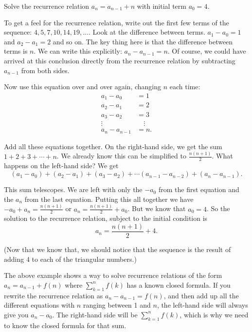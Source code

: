 \documentclass[11pt,]{book}
\theoremstyle{ptxplainnotitle}
\theoremstyle{ptxplaintitle}
\theoremstyle{ptxdefinitionnotitle}
\theoremstyle{ptxdefinitiontitle}
\theoremstyle{ptxdefinitionnotitle}
\theoremstyle{ptxdefinitiontitle}
\theoremstyle{ptxdefinitionnotitle}
\theoremstyle{ptxdefinitiontitle}
\theoremstyle{ptxdefinitiontitlenonumber}
\theoremstyle{ptxdefinitiontitlenonumber}
\numberwithin{equation}{chapter}
\newcommand{\amp}{&}
\begin{document}
\begin{example}\label{example-20}
\hypertarget{p-432}{}%
Solve the recurrence relation \(a_n = a_{n-1} + n\) with initial term \(a_0 = 4\).%
\par\smallskip%
\noindent\textbf{}\hypertarget{solution-66}{}\hypertarget{p-433}{}%
To get a feel for the recurrence relation, write out the first few terms of the sequence: \(4, 5, 7, 10, 14, 19, \ldots\). Look at the difference between terms. \(a_1 - a_0 = 1\) and \(a_2 - a_1 = 2\) and so on. The key thing here is that the difference between terms is \(n\). We can write this explicitly: \(a_n - a_{n-1} = n\). Of course, we could have arrived at this conclusion directly from the recurrence relation by subtracting \(a_{n-1}\) from both sides.%
\par
\hypertarget{p-434}{}%
Now use this equation over and over again, changing \(n\) each time:%
\begin{align*}
a_1 - a_0 \amp = 1\\
a_2 - a_1 \amp = 2\\
a_3 - a_2 \amp = 3\\
\vdots \quad \amp \quad \vdots\\
a_n - a_{n-1} \amp = n.
\end{align*}
%
\par
\hypertarget{p-435}{}%
Add all these equations together. On the right-hand side, we get the sum \(1 + 2 + 3 + \cdots + n\). We already know this can be simplified to \(\frac{n(n+1)}{2}\). What happens on the left-hand side? We get%
\begin{equation*}
(a_1 - a_0) + (a_2 - a_1) + (a_3 - a_2) + \cdots (a_{n-1} - a_{n-2})+ (a_n - a_{n-1}).
\end{equation*}
%
\par
\hypertarget{p-436}{}%
This sum telescopes. We are left with only the \(-a_0\) from the first equation and the \(a_n\) from the last equation. Putting this all together we have \(-a_0 + a_n = \frac{n(n+1)}{2}\) or \(a_n = \frac{n(n+1)}{2} + a_0\). But we know that \(a_0 = 4\). So the solution to the recurrence relation, subject to the initial condition is%
\begin{equation*}
a_n = \frac{n(n+1)}{2} + 4.
\end{equation*}
%
\par
\hypertarget{p-437}{}%
(Now that we know that, we should notice that the sequence is the result of adding 4 to each of the triangular numbers.)%
\end{example}
\hypertarget{p-438}{}%
The above example shows a way to solve recurrence relations of the form \(a_n = a_{n-1} + f(n)\) where \(\sum_{k = 1}^n f(k)\) has a known closed formula. If you rewrite the recurrence relation as \(a_n - a_{n-1} = f(n)\), and then add up all the different equations with \(n\) ranging between 1 and \(n\), the left-hand side will always give you \(a_n - a_0\). The right-hand side will be \(\sum_{k = 1}^n f(k)\), which is why we need to know the closed formula for that sum.%
\end{document}
